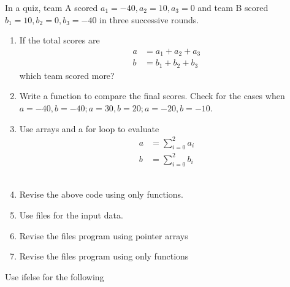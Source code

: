 In a quiz, team A scored $a_1 = -40, a_2=10, a_3=0$ and team B scored $b_1=10, b_2=0, b_3=-40$ in three successive rounds.
\begin{enumerate}[label=\thesection.\arabic*, ref=\thesubsection.\theenumi]
\item  If the total scores are 
	\begin{align}
		a &= a_1+a_2+a_3
		\\
		b &= b_1+b_2+b_3
	\end{align}
	which team scored more? 
	\\
	\solution 
	
\item Write a function to compare the final scores.  Check for the cases when $a = -40, b = -40; a = 30, b = 20; a = -20, b = -10$.
	\\
	\solution 
	
\item Use arrays and a for loop to evaluate 
	\begin{align}
		a &= \sum_{i=0}^{2}a_i
		\\
		b &= \sum_{i=0}^{2}b_i
	\end{align}
	\\
	\solution 
	
\item Revise the above code using only functions.
	\\
	\solution 
	
\item Use files for the input data.
	\\
	\solution 
	
\item Revise the files program using pointer arrays
	\\
	\solution 
	
\item Revise the files program using only functions
	\\
	\solution 
	
\end{enumerate}
Use ifelse  for the following
